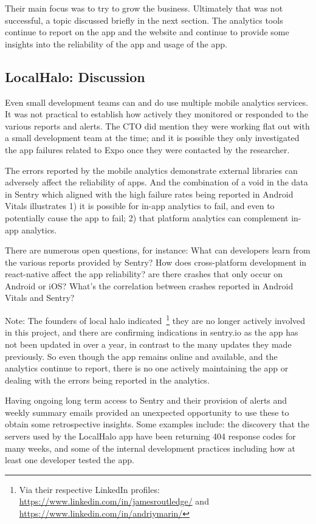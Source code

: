 Their main focus was to try to grow the business. Ultimately that was not successful, a topic discussed briefly in the next section. The analytics tools continue to report on the app and the website and continue to provide some insights into the reliability of the app and usage of the app.

\subsection{LocalHalo: Discussion}
Even small development teams can and do use multiple mobile analytics services. It was not practical to establish how actively they monitored or responded to the various reports and alerts. The CTO did mention they were working flat out with a small development team at the time; and it is possible they only investigated the app failures related to Expo once they were contacted by the researcher.   

The errors reported by the mobile analytics demonstrate external libraries can adversely affect the reliability of apps. And the combination of a void in the data in Sentry which aligned with the high failure rates being reported in Android Vitals illustrates 1) it is possible for in-app analytics to fail, and even to potentially cause the app to fail; 2) that platform analytics can complement in-app analytics.

There are numerous open questions, for instance: What can developers learn from the various reports provided by Sentry? How does cross-platform development in react-native affect the app reliability? are there crashes that only occur on Android or iOS? What's the correlation between crashes reported in Android Vitals and Sentry?

Note: The founders of local halo indicated~\footnote{Via their respective LinkedIn profiles: \url{https://www.linkedin.com/in/jamesroutledge/} and \url{https://www.linkedin.com/in/andriymarin/}} they are no longer actively involved in this project, and there are confirming indications in sentry.io as the app has not been updated in over a year, in contrast to the many updates they made previously. So even though the app remains online and available, and the analytics continue to report, there is no one actively maintaining the app or dealing with the errors being reported in the analytics.


Having ongoing long term access to Sentry and their provision of alerts and weekly summary emails provided an unexpected opportunity to use these to obtain some retrospective insights. Some examples include: the discovery that the servers used by the LocalHalo app have been returning 404 response codes for many weeks, and some of the internal development practices including how at least one developer tested the app.


